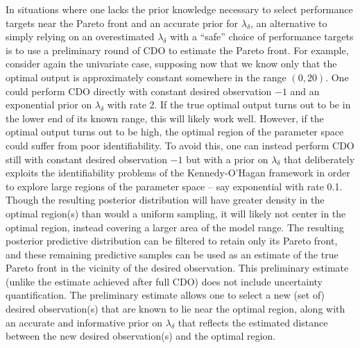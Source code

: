 \documentclass[12pt]{article}
\begin{document}
In situations where one lacks the prior knowledge necessary to select performance targets near the Pareto front and an accurate prior for $\lambda_\delta$, an alternative to simply relying on an overestimated $\lambda_\delta$ with a ``safe'' choice of performance targets is to use a preliminary round of CDO to estimate the Pareto front.
%
For example, consider again the univariate case, supposing now that we know only that the optimal output is approximately constant somewhere in the range $(0,20)$. 
%
%
One could perform CDO directly with constant desired observation $-1$ and an exponential prior on $\lambda_\delta$ with rate 2.
%
If the true optimal output turns out to be in the lower end of its known range, this will likely work well.
%
However, if the optimal output turns out to be high, the optimal region of the parameter space could suffer from poor identifiability.
%
To avoid this, one can instead perform CDO still with constant desired observation $-1$ but with a prior on $\lambda_\delta$ that deliberately exploits the identifiability problems of the Kennedy-O'Hagan framework in order to explore large regions of the parameter space -- say exponential with rate 0.1.
% 
Though the resulting posterior distribution will have greater density in the optimal region(s) than would a uniform sampling, it will likely not center in the optimal region, instead covering a larger area of the model range.
%
The resulting posterior predictive distribution can be filtered to retain only its Pareto front, and these remaining predictive samples can be used as an estimate of the true Pareto front in the vicinity of the desired observation.
%
This preliminary estimate (unlike the estimate achieved after full CDO) does not include uncertainty quantification.%
%
The preliminary estimate allows one to select a new (set of) desired observation(s) that are known to lie near the optimal region, along with an accurate and informative prior on $\lambda_\delta$ that reflects the estimated distance between the new desired observation(s) and the optimal region.
\end{document}
